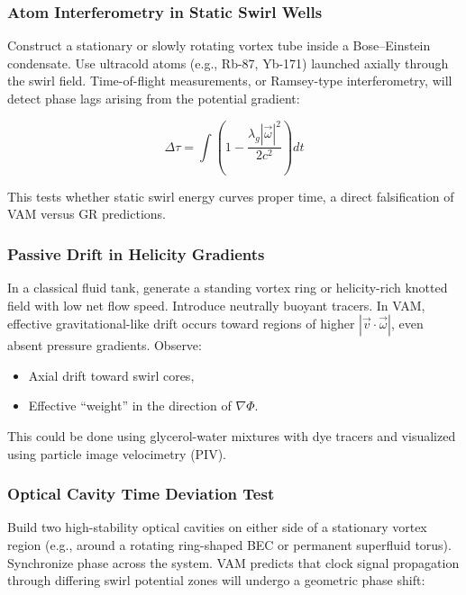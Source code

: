 \documentclass[preprint]{revtex4-2}
\begin{document}
            \subsubsection{Atom Interferometry in Static Swirl Wells}
            Construct a stationary or slowly rotating vortex tube inside a Bose–Einstein condensate. Use ultracold atoms (e.g., Rb-87, Yb-171) launched axially through the swirl field. Time-of-flight measurements, or Ramsey-type interferometry, will detect phase lags arising from the potential gradient:
        
            \begin{equation}
                \Delta \tau = \int \left(1 - \frac{\lambda_g |\vec{\omega}|^2}{2 c^2} \right) dt
            \end{equation}
        
            This tests whether static swirl energy curves proper time, a direct falsification of VAM versus GR predictions.
        
            \subsubsection{Passive Drift in Helicity Gradients}
            In a classical fluid tank, generate a standing vortex ring or helicity-rich knotted field with low net flow speed. Introduce neutrally buoyant tracers. In VAM, effective gravitational-like drift occurs toward regions of higher \( |\vec{v} \cdot \vec{\omega}| \), even absent pressure gradients. Observe:
        
            \begin{itemize}
                \item Axial drift toward swirl cores,
                \item Effective “weight” in the direction of \( \nabla \Phi \).
            \end{itemize}
        
            This could be done using glycerol-water mixtures with dye tracers and visualized using particle image velocimetry (PIV).
        
            \subsubsection{Optical Cavity Time Deviation Test}
            Build two high-stability optical cavities on either side of a stationary vortex region (e.g., around a rotating ring-shaped BEC or permanent superfluid torus). Synchronize phase across the system. VAM predicts that clock signal propagation through differing swirl potential zones will undergo a geometric phase shift:
        
\end{document}
